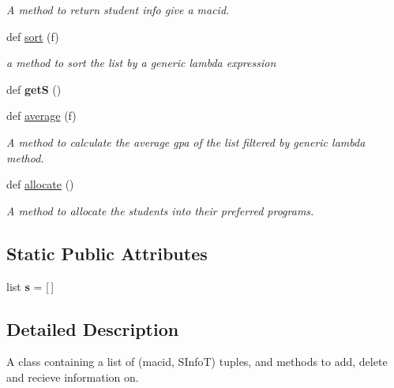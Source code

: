 \begin{DoxyCompactItemize}
\begin{DoxyCompactList}\small\item\em A method to return student info give a macid. \end{DoxyCompactList}\item 
def \mbox{\hyperlink{class_s_a_lst_1_1_s_a_lst_af39c6101199578aefb42a15719754a61}{sort}} (f)
\begin{DoxyCompactList}\small\item\em a method to sort the list by a generic lambda expression \end{DoxyCompactList}\item 
\mbox{\label{class_s_a_lst_1_1_s_a_lst_aab0e944f9f796051c78b385df084f051}} 
def {\bfseries getS} ()
\item 
def \mbox{\hyperlink{class_s_a_lst_1_1_s_a_lst_ae9c71d13a081d2eca72857c21840dd4b}{average}} (f)
\begin{DoxyCompactList}\small\item\em A method to calculate the average gpa of the list filtered by generic lambda method. \end{DoxyCompactList}\item 
def \mbox{\hyperlink{class_s_a_lst_1_1_s_a_lst_a8cdba5b89e936165b3628f52d4e80938}{allocate}} ()
\begin{DoxyCompactList}\small\item\em A method to allocate the students into their preferred programs. \end{DoxyCompactList}\end{DoxyCompactItemize}
\subsection*{Static Public Attributes}
\begin{DoxyCompactItemize}
\item 
\mbox{\label{class_s_a_lst_1_1_s_a_lst_a6f08c6ea97883ece00584929a0f4db65}} 
list {\bfseries s} = \mbox{[}$\,$\mbox{]}
\end{DoxyCompactItemize}


\subsection{Detailed Description}
A class containing a list of (\textquotesingle{}macid\textquotesingle{}, S\+InfoT) tuples, and methods to add, delete and recieve information on. 

